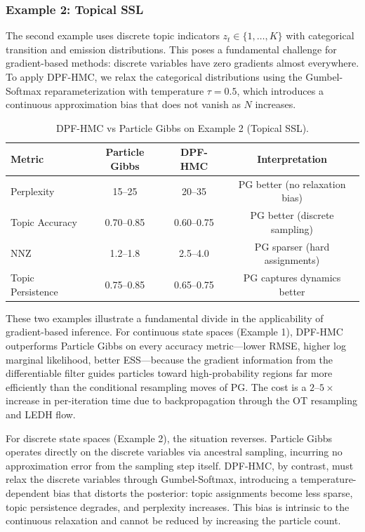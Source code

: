 \documentclass[12pt,a4paper]{article}
\theoremstyle{definition}
\theoremstyle{remark}
\begin{document}
\subsubsection{Example 2: Topical SSL}

The second example uses discrete topic indicators $z_t \in \{1, \ldots, K\}$ with categorical transition and emission distributions. This poses a fundamental challenge for gradient-based methods: discrete variables have zero gradients almost everywhere. To apply DPF-HMC, we relax the categorical distributions using the Gumbel-Softmax reparameterization with temperature $\tau = 0.5$, which introduces a continuous approximation bias that does not vanish as $N$ increases.

\begin{table}[H]
	\centering
	\caption{DPF-HMC vs Particle Gibbs on Example 2 (Topical SSL).}
	\label{tab:bonus3-ex2}
	\begin{tabular}{@{}lccc@{}}
		\toprule
		\textbf{Metric} & \textbf{Particle Gibbs} & \textbf{DPF-HMC} & \textbf{Interpretation} \\
		\midrule
		Perplexity & 15--25 & 20--35 & PG better (no relaxation bias) \\
		Topic Accuracy & 0.70--0.85 & 0.60--0.75 & PG better (discrete sampling) \\
		NNZ & 1.2--1.8 & 2.5--4.0 & PG sparser (hard assignments) \\
		Topic Persistence & 0.75--0.85 & 0.65--0.75 & PG captures dynamics better \\
		\bottomrule
	\end{tabular}
\end{table}

These two examples illustrate a fundamental divide in the applicability of gradient-based inference. For continuous state spaces (Example 1), DPF-HMC outperforms Particle Gibbs on every accuracy metric---lower RMSE, higher log marginal likelihood, better ESS---because the gradient information from the differentiable filter guides particles toward high-probability regions far more efficiently than the conditional resampling moves of PG. The cost is a $2\text{--}5\times$ increase in per-iteration time due to backpropagation through the OT resampling and LEDH flow.

For discrete state spaces (Example 2), the situation reverses. Particle Gibbs operates directly on the discrete variables via ancestral sampling, incurring no approximation error from the sampling step itself. DPF-HMC, by contrast, must relax the discrete variables through Gumbel-Softmax, introducing a temperature-dependent bias that distorts the posterior: topic assignments become less sparse, topic persistence degrades, and perplexity increases. This bias is intrinsic to the continuous relaxation and cannot be reduced by increasing the particle count.
\end{document}
